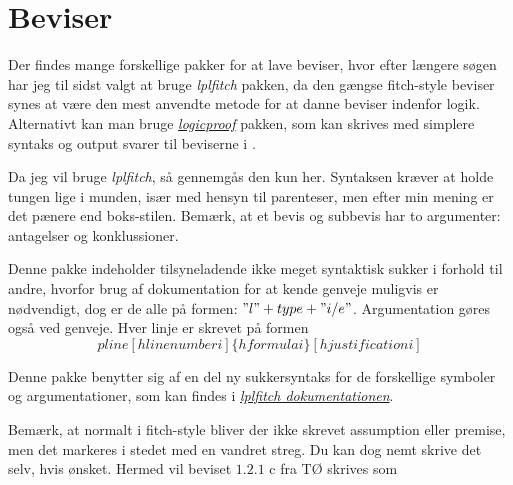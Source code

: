 \documentclass[a4, danish]{article}
\begin{document}
\section{Beviser}
Der findes mange forskellige pakker for at lave beviser, hvor efter længere søgen har jeg til sidst valgt at bruge \emph{lplfitch} pakken, da den gængse fitch-style beviser synes at være den mest anvendte metode for at danne beviser indenfor logik. Alternativt kan man bruge \href{http://mirrors.dotsrc.org/ctan/macros/latex/contrib/logicproof/logicproof.pdf}{\emph{logicproof}} pakken, som kan skrives med simplere syntaks og output svarer til beviserne i \cite{berlog}.


Da jeg vil bruge \emph{lplfitch}, så gennemgås den kun her. Syntaksen kræver at holde tungen lige i munden, især med hensyn til parenteser, men efter min mening er det pænere end boks-stilen. Bemærk, at et bevis og subbevis har to argumenter: antagelser og konklussioner.
\begin{center}
\end{center}

Denne pakke indeholder tilsyneladende ikke meget syntaktisk sukker i forhold til andre, hvorfor brug af dokumentation for at kende genveje muligvis er nødvendigt, dog er de alle på formen: $"l" + type + "i/e"$. Argumentation gøres også ved genveje. Hver linje er skrevet på formen
\begin{equation*}
    pline[hline number i]\{hformulai\}[hjustificationi]
\end{equation*}

Denne pakke benytter sig af en del ny sukkersyntaks for de forskellige symboler og argumentationer, som kan findes i \href{http://mirrors.dotsrc.org/ctan/macros/latex/contrib/lplfitch/lplfitch.pdf}{\emph{lplfitch dokumentationen}}.

Bemærk, at normalt i fitch-style bliver der ikke skrevet assumption eller premise, men det markeres i stedet med en vandret streg. Du kan dog nemt skrive det selv, hvis ønsket. Hermed vil beviset $1.2.1$ c fra TØ skrives som
\begin{center}
\end{center}
\end{document}
